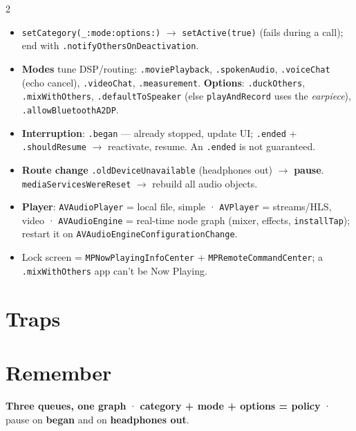 \documentclass[8pt]{extarticle}
\begin{document}
\begin{multicols}{2}
\begin{itemize}
  \item \texttt{setCategory(\_:mode:options:)} $\to$ \texttt{setActive(true)} (fails
        during a call); end with \texttt{.notifyOthersOnDeactivation}.
  \item \textbf{Modes} tune DSP/routing: \texttt{.moviePlayback},
        \texttt{.spokenAudio}, \texttt{.voiceChat} (echo cancel), \texttt{.videoChat},
        \texttt{.measurement}. \textbf{Options}: \texttt{.duckOthers},
        \texttt{.mixWithOthers}, \texttt{.defaultToSpeaker} (else
        \texttt{playAndRecord} uses the \emph{earpiece}), \texttt{.allowBluetoothA2DP}.
  \item \textbf{Interruption}: \texttt{.began} — already stopped, update UI;
        \texttt{.ended} + \texttt{.shouldResume} $\to$ reactivate, resume. An
        \texttt{.ended} is not guaranteed.
  \item \textbf{Route change} \texttt{.oldDeviceUnavailable} (headphones out) $\to$
        \textbf{pause}. \texttt{mediaServicesWereReset} $\to$ rebuild all audio objects.
  \item \textbf{Player}: \texttt{AVAudioPlayer} = local file, simple ·
        \texttt{AVPlayer} = streams/HLS, video · \texttt{AVAudioEngine} = real-time
        node graph (mixer, effects, \texttt{installTap}); restart it on
        \texttt{AVAudioEngineConfigurationChange}.
  \item Lock screen = \texttt{MPNowPlaying\allowbreak InfoCenter} +
        \texttt{MPRemoteCommand\allowbreak Center};
        a \texttt{.mixWithOthers} app can't be Now Playing.
\end{itemize}

\section{Traps}
\begin{itemize}
\end{itemize}

\section{Remember}
\textbf{Three queues, one graph} · \textbf{category + mode + options = policy} ·
pause on \textbf{began} and on \textbf{headphones out}.

\end{multicols}

\end{document}
